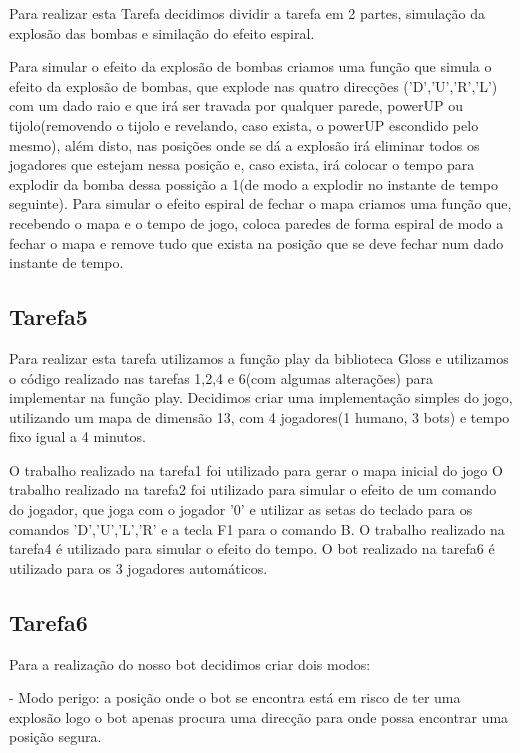 \documentclass[a4paper]{article}
\begin{document}
Para realizar esta Tarefa decidimos dividir a tarefa em 2 partes, simulação da explosão das bombas e similação do efeito espiral.

Para simular o efeito da explosão de bombas criamos uma função que 
simula o efeito da explosão de bombas, que explode nas quatro direcções ('D','U','R','L')
com um dado raio e que irá ser travada por qualquer parede, powerUP
 ou tijolo(removendo o tijolo e revelando, caso exista, o powerUP escondido pelo mesmo),
além disto, nas posições onde se dá a explosão irá eliminar todos os jogadores que estejam nessa posição e, 
caso exista, irá colocar o tempo para explodir
da bomba dessa possição a 1(de modo a explodir no instante de tempo seguinte).
Para simular o efeito espiral de fechar o mapa criamos uma função que, 
recebendo o mapa e o tempo de jogo, coloca paredes de forma espiral
de modo a fechar o mapa e remove tudo que exista na posição que se deve fechar num dado instante de tempo.


\subsection{Tarefa5}

Para realizar esta tarefa utilizamos a função play da biblioteca Gloss e 
utilizamos o código realizado nas tarefas 1,2,4 e 6(com algumas alterações)
para implementar na função play.
Decidimos criar uma implementação simples do jogo, utilizando um mapa de dimensão 13, com 4 jogadores(1 humano, 3 bots) e tempo fixo igual a 4 minutos.

O trabalho realizado na tarefa1 foi utilizado para gerar o mapa inicial do jogo
O trabalho realizado na tarefa2 foi utilizado para simular o efeito de um comando do jogador,
que joga com o jogador '0' e utilizar as setas do teclado para os comandos 'D','U','L','R' e a tecla F1 para o comando B.
O trabalho realizado na tarefa4 é utilizado para simular o efeito do tempo.
O bot realizado na tarefa6 é utilizado para os 3 jogadores automáticos.


\subsection{Tarefa6}

Para a realização do nosso bot decidimos criar dois modos:

- Modo perigo: a posição onde o bot se encontra está em risco de ter uma explosão logo o bot apenas procura uma direcção para onde possa encontrar uma posição segura.
\end{document}
